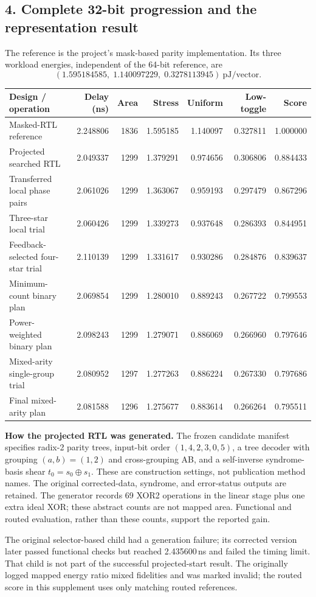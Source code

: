 \documentclass[10pt]{article}
\newcommand{\sect}[1]{\subsection*{#1}}
\begin{document}
\newpage
\sect{4. Complete 32-bit progression and the representation result}
The reference is the project's mask-based parity implementation. Its three workload energies, independent of the 64-bit reference, are\[ (1.595184585,\;1.140097229,\;0.3278113945)\ \mathrm{pJ/vector}.\]
\begin{center}\fontsize{8.4}{10.1}\selectfont\setlength{\tabcolsep}{3.6pt}
\begin{tabular}{@{}>{\raggedright\arraybackslash}p{5.3cm}rrrrrr@{}}\toprule
Design / operation & Delay (ns) & Area & Stress & Uniform & Low-toggle & Score\\\midrule
Masked-RTL reference & 2.248806 & 1836 & 1.595185 & 1.140097 & 0.327811 & 1.000000\\
Projected searched RTL & 2.049337 & 1299 & 1.379291 & 0.974656 & 0.306806 & 0.884433\\
Transferred local phase pairs & 2.061026 & 1299 & 1.363067 & 0.959193 & 0.297479 & 0.867296\\
Three-star local trial & 2.060426 & 1299 & 1.339273 & 0.937648 & 0.286393 & 0.844951\\
Feedback-selected four-star trial & 2.110139 & 1299 & 1.331617 & 0.930286 & 0.284876 & 0.839637\\
Minimum-count binary plan & 2.069854 & 1299 & 1.280010 & 0.889243 & 0.267722 & 0.799553\\
Power-weighted binary plan & 2.098243 & 1299 & 1.279071 & 0.886069 & 0.266960 & 0.797646\\
Mixed-arity single-group trial & 2.080952 & 1297 & 1.277263 & 0.886224 & 0.267330 & 0.797686\\
Final mixed-arity plan & 2.081588 & 1296 & 1.275677 & 0.883614 & 0.266264 & 0.795511\\
\bottomrule\end{tabular}\end{center}
\textbf{How the projected RTL was generated.} The frozen candidate manifest specifies radix-2 parity trees, input-bit order $(1,4,2,3,0,5)$, a tree decoder with grouping $(a,b)=(1,2)$ and cross-grouping AB, and a self-inverse syndrome-basis shear $t_0=s_0\oplus s_1$. These are construction settings, not publication method names. The original corrected-data, syndrome, and error-status outputs are retained. The generator records 69 XOR2 operations in the linear stage plus one extra ideal XOR; these abstract counts are not mapped area. Functional and routed evaluation, rather than these counts, support the reported gain.

The original selector-based child had a generation failure; its corrected version later passed functional checks but reached 2.435600\,ns and failed the timing limit. That child is not part of the successful projected-start result. The originally logged mapped energy ratio mixed fidelities and was marked invalid; the routed score in this supplement uses only matching routed references.
\end{document}
